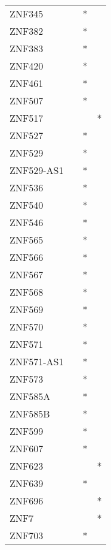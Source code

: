 \begin{longtable}{lccc}
ZNF345       &           &   * &         \\
ZNF382       &           &   * &         \\
ZNF383       &           &   * &         \\
ZNF420       &           &   * &         \\
ZNF461       &           &   * &         \\
ZNF507       &           &   * &         \\
ZNF517       &           &     &       * \\
ZNF527       &           &   * &         \\
ZNF529       &           &   * &         \\
ZNF529-AS1   &           &   * &         \\
ZNF536       &           &   * &         \\
ZNF540       &           &   * &         \\
ZNF546       &           &   * &         \\
ZNF565       &           &   * &         \\
ZNF566       &           &   * &         \\
ZNF567       &           &   * &         \\
ZNF568       &           &   * &         \\
ZNF569       &           &   * &         \\
ZNF570       &           &   * &         \\
ZNF571       &           &   * &         \\
ZNF571-AS1   &           &   * &         \\
ZNF573       &           &   * &         \\
ZNF585A      &           &   * &         \\
ZNF585B      &           &   * &         \\
ZNF599       &           &   * &         \\
ZNF607       &           &   * &         \\
ZNF623       &           &     &       * \\
ZNF639       &           &   * &         \\
ZNF696       &           &     &       * \\
ZNF7         &           &     &       * \\
ZNF703       &           &   * &         \\

\end{longtable}
